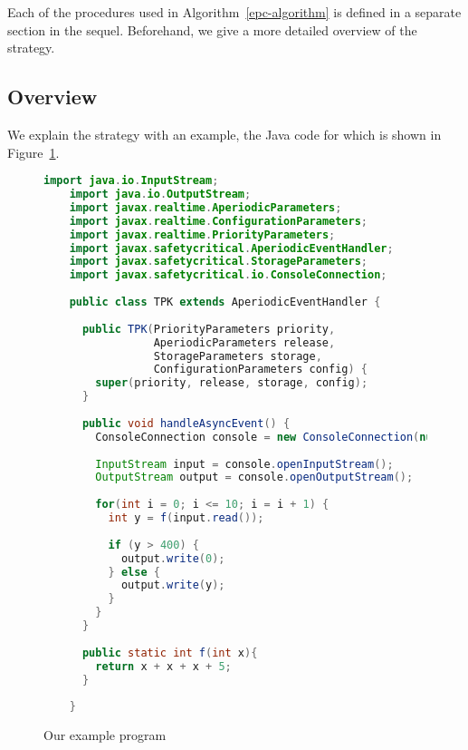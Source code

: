 Each of the procedures used in Algorithm~\ref{epc-algorithm} is
defined in a separate section in the sequel.
Beforehand, we give a more detailed overview of the strategy.

\subsection{Overview}
\label{overview-subsection}

We explain the strategy with an example, the Java code for which is
shown in Figure~\ref{example-code-figure}.
\begin{figure}[t!]
  \begin{lstlisting}[language=Java,basicstyle=\ttfamily\footnotesize]
    import java.io.InputStream;
    import java.io.OutputStream;
    import javax.realtime.AperiodicParameters;
    import javax.realtime.ConfigurationParameters;
    import javax.realtime.PriorityParameters;
    import javax.safetycritical.AperiodicEventHandler;
    import javax.safetycritical.StorageParameters;
    import javax.safetycritical.io.ConsoleConnection;
    
    public class TPK extends AperiodicEventHandler {
      
      public TPK(PriorityParameters priority,
                 AperiodicParameters release,
                 StorageParameters storage,
                 ConfigurationParameters config) {
        super(priority, release, storage, config);
      }
      
      public void handleAsyncEvent() {
        ConsoleConnection console = new ConsoleConnection(null);
        
        InputStream input = console.openInputStream();
        OutputStream output = console.openOutputStream();
        
        for(int i = 0; i <= 10; i = i + 1) {
          int y = f(input.read());
          
          if (y > 400) {
            output.write(0);
          } else {
            output.write(y);
          }
        }
      }
      
      public static int f(int x){
        return x + x + x + 5;
      }
      
    }
  \end{lstlisting}
  \caption{Our example program}
  \label{example-code-figure}
\end{figure}
